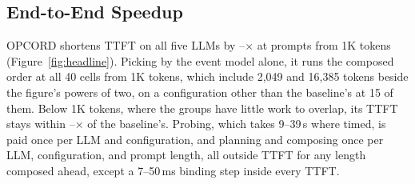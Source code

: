 \subsection{End-to-End Speedup}
\label{subsec:e2e}

OPCORD shortens TTFT on all five LLMs by \PrefillGainLo--\PrefillGainHi$\times$ at prompts from 1K tokens (Figure~\ref{fig:headline}).
Picking by the event model alone, it runs the composed order at all 40 cells from 1K tokens, which include 2{,}049 and 16{,}385 tokens beside the figure's powers of two, on a configuration other than the baseline's at 15 of them.
Below 1K tokens, where the groups have little work to overlap, its TTFT stays within \ShortGainLo--\ShortGainHi$\times$ of the baseline's.
Probing, which takes 9--39\,s where timed, is paid once per LLM and configuration, and planning and composing once per LLM, configuration, and prompt length, all outside TTFT for any length composed ahead, except a 7--50\,ms binding step inside every TTFT.

